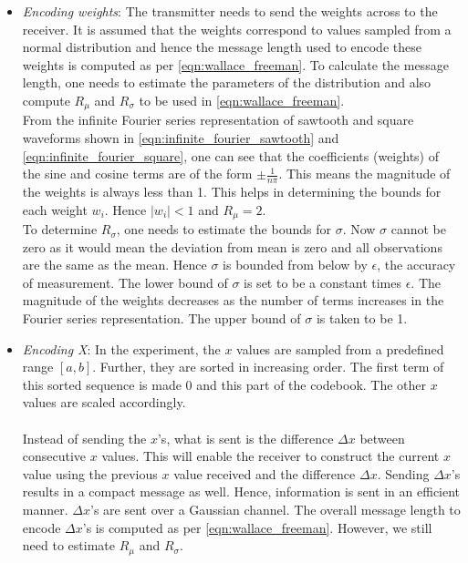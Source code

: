 \documentclass[a4paper,12pt]{article}
\begin{document}
\begin{itemize}
 \item \textit{Encoding weights}: The transmitter needs to send the weights across to the receiver. It is assumed that the weights correspond to values sampled from a normal distribution and hence the message length used to encode these weights is computed as per \eqref{eqn:wallace_freeman}. To calculate the message length, one needs to estimate the parameters of the distribution and also compute $R_{\mu}$ and $R_{\sigma}$ to be used in \eqref{eqn:wallace_freeman}. \\
 
 From the infinite Fourier series representation of sawtooth and square waveforms shown in \eqref{eqn:infinite_fourier_sawtooth} and \eqref{eqn:infinite_fourier_square}, one can see that the coefficients (weights) of the sine and cosine terms are of the form $\pm\frac{1}{n\pi}$. This means the magnitude of the weights is always less than 1. This helps in determining the bounds for each weight $w_i$. Hence $|w_i| < 1$ and $R_{\mu} = 2$. \\
 
 To determine $R_{\sigma}$, one needs to estimate the bounds for $\sigma$. Now $\sigma$ cannot be zero as it would mean the deviation from mean is zero and all observations are the same as the mean. Hence $\sigma$ is bounded from below by $\epsilon$, the accuracy of measurement. The lower bound of $\sigma$ is set to be a constant times $\epsilon$. The magnitude of the weights decreases as the number of terms increases in the Fourier series representation. The upper bound of $\sigma$ is taken to be 1.
 
 \item \textit{Encoding X}: In the experiment, the $x$ values are sampled from a predefined range $[a,b]$. Further, they are sorted in increasing order. The first term of this sorted sequence is made 0 and this part of the codebook. The other $x$ values are scaled accordingly. \\\\
 Instead of sending the $x$'s, what is sent is the difference $\Delta x$ between consecutive $x$ values. This will enable the receiver to construct the current $x$ value using the previous $x$ value received and the difference $\Delta x$. Sending $\Delta x$'s results in a compact message as well. Hence, information is sent in an efficient manner. $\Delta x$'s are sent over a Gaussian channel. The overall message length to encode $\Delta x$'s is computed as per \eqref{eqn:wallace_freeman}. However, we still need to estimate $R_{\mu}$ and $R_{\sigma}$.\\
 

\end{itemize}
\end{document}
